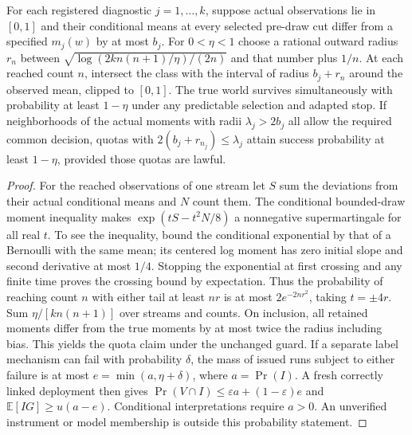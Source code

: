 \begin{theorem}\label{adv:g023}
For each registered diagnostic \(j=1,\ldots,k\), suppose actual observations lie in \([0,1]\) and their conditional means at every selected pre-draw cut differ from a specified \(m_j(w)\) by at most \(b_j\). For \(0<\eta<1\) choose a rational outward radius \(r_n\) between \(\sqrt{\log(2k n(n+1)/\eta)/(2n)}\) and that number plus \(1/n\). At each reached count \(n\), intersect the class with the interval of radius \(b_j+r_n\) around the observed mean, clipped to \([0,1]\). The true world survives simultaneously with probability at least \(1-\eta\) under any predictable selection and adapted stop. If neighborhoods of the actual moments with radii \(\lambda_j>2b_j\) all allow the required common decision, quotas with \(2(b_j+r_{n_j})\le\lambda_j\) attain success probability at least \(1-\eta\), provided those quotas are lawful.
\end{theorem}
\begin{proof}
For the reached observations of one stream let \(S\) sum the deviations from their actual conditional means and \(N\) count them. The conditional bounded-draw moment inequality makes \(\exp(tS-t^2N/8)\) a nonnegative supermartingale for all real \(t\). To see the inequality, bound the conditional exponential by that of a Bernoulli with the same mean; its centered log moment has zero initial slope and second derivative at most \(1/4\). Stopping the exponential at first crossing and any finite time proves the crossing bound by expectation. Thus the probability of reaching count \(n\) with either tail at least \(nr\) is at most \(2e^{-2nr^2}\), taking \(t=\pm4r\). Sum \(\eta/[k n(n+1)]\) over streams and counts. On inclusion, all retained moments differ from the true moments by at most twice the radius including bias. This yields the quota claim under the unchanged guard. If a separate label mechanism can fail with probability \(\delta\), the mass of issued runs subject to either failure is at most \(e=\min(a,\eta+\delta)\), where \(a=\Pr(I)\). A fresh correctly linked deployment then gives \(\Pr(V\cap I)\le\varepsilon a+(1-\varepsilon)e\) and \(\mathbb E[IG]\ge u(a-e)\). Conditional interpretations require \(a>0\). An unverified instrument or model membership is outside this probability statement.
\end{proof}

